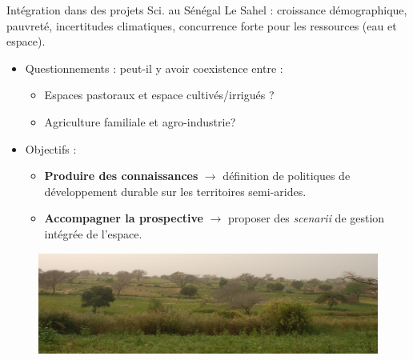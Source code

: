 \documentclass[newPxFont]{beamer}
\begin{document}

\begin{frame}{Intégration dans des projets Sci. au Sénégal}
	\vspace{-2em}
    Le Sahel : croissance démographique, pauvreté, incertitudes climatiques, concurrence forte pour les ressources (eau et espace).
  	\begin{itemize}
      \item Questionnements : peut-il y avoir coexistence entre :
      \begin{itemize}
        \item Espaces pastoraux et espace cultivés/irrigués ?
        \item Agriculture familiale et agro-industrie?
      \end{itemize}
      \item Objectifs :
      \begin{itemize}
        \item \textbf{Produire des connaissances} $\rightarrow$ définition de politiques de développement durable sur les territoires semi-arides.
        \item \textbf{Accompagner la prospective} $\rightarrow$ proposer des \textit{scenarii} de gestion intégrée de l'espace.
      \end{itemize}
  	\end{itemize}
    \vspace{-1em}
  \begin{figure}
    \includegraphics[width=\textwidth]{img/agri_pasto}
  \end{figure}
\end{frame}
\end{document}
